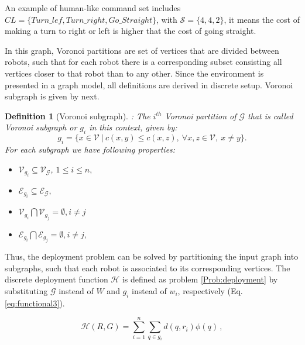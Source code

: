 \documentclass[twocolumn]{svjour3}       %
\newtheorem{mydef}{Definition}
\begin{document}
An example of human-like command set includes \sloppy $CL=\{Turn\_lef, Turn\_right, Go\_Straight\}$, with $\mathcal S=\{4,4,2\}$, it means the cost of making a turn to right or left is higher that the cost of going straight.
%

In this graph, Voronoi partitions are set of vertices that are divided between robots, such that for each robot there is a corresponding subset consisting all vertices closer to that robot than to any other.
%
Since the environment is presented in a graph model, all definitions are derived in discrete setup. Voronoi subgraph is given by next.

\begin{mydef}[Voronoi subgraph]:
\label{def:voronoi}
\qquad \qquad \qquad \qquad \qquad 
\textnormal{
The $i^{th}$ Voronoi partition of $\mathcal{G}$ that is called Voronoi subgraph or $g_i$ in this context, given by:
}
%
\begin{equation}
\label{eq:VoronoiregionCVT} 
g_i = \{x \in \mathcal{V}~ |~ c(x,y)\leq c(x,z),~ \forall x,z \in \mathcal{V},~ x\neq y\}.
\end{equation}
%
\textnormal{For each subgraph we have following properties:}
%
\begin{itemize}
	\item $\mathcal{V}_{g_i}\subseteq  \mathcal{V}_\mathcal{G} $, $1 \leq i \leq n ,$ 
	\item $ \mathcal{E}_{g_i} \subseteq \mathcal{E}_\mathcal{G},$
	\item $\mathcal{V}_{g_i} \bigcap \mathcal{V}_{g_j}=\emptyset  , i \neq j$
	\item $\mathcal{E}_{g_i} \bigcap \mathcal{E}_{g_j}=\emptyset  , i \neq j,$
\end{itemize}

\end{mydef}

Thus, the deployment problem can be solved by partitioning the input graph into subgraphs, such that each robot is associated to its corresponding vertices. The discrete deployment function $\mathcal{H}$ is defined as problem \ref{Prob:deployment} by substituting $\mathcal{G}$ instead of $W$ and $g_i$ instead of $w_i$, respectively (Eq. \ref{eq:functional3}).

%
\begin{equation}\label{eq:functional3}
\mathcal{H}(R,G) =
\sum_{i = 1}^{n} \sum_{q \in g_i}
d(q, r_i)\phi(q) \,,
\end{equation}
%
\end{document}
